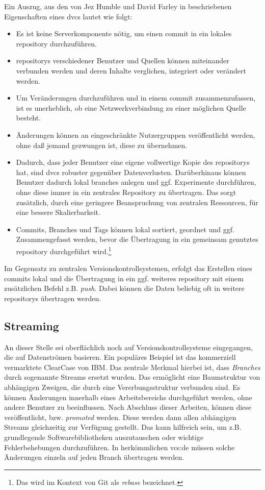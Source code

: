 Ein Auszug, aus den von Jez Humble und David Farley in \cite[S.~393-394]{cd}
beschriebenen Eigenschaften eines \acrshort{dvcs} lautet wie folgt:

\begin{itemize}
\item Es ist keine Serverkomponente nötig, um einen \gls{commit} in ein lokales
\gls{repository} durchzuführen.
\item \glspl{repository} verschiedener Benutzer und Quellen können miteinander
verbunden werden und deren Inhalte verglichen, integriert oder verändert werden.
\item Um Veränderungen durchzuführen und in einem \gls{commit} zusammenzufassen,
ist es unerheblich, ob eine Netzwerkverbindung zu einer möglichen Quelle besteht.
\item Änderungen können an eingeschränkte Nutzergruppen veröffentlicht werden,
ohne daß jemand gezwungen ist, diese zu übernehmen.
\item Dadurch, dass jeder Benutzer eine eigene vollwertige Kopie des
\glspl{repository} hat, sind \acrshort{dvcs} robuster gegenüber Datenverlusten.
Darüberhinaus können Benutzer dadurch lokal branches anlegen und ggf.
Experimente durchführen, ohne diese immer in ein zentrales Repository zu
übertragen.  Das sorgt zusätzlich, durch eine geringere Beanspruchung von
zentralen Ressourcen, für eine bessere Skalierbarkeit.
\item Commits, Branches und Tags können lokal sortiert, geordnet und ggf.
Zusammengefasst werden, bevor die Übertragung in ein gemeinsam genutztes
\gls{repository} durchgeführt wird.\footnote{Das wird im Kontext von Git als
\textit{rebase} bezeichnet.}
\end{itemize}

Im Gegensatz zu zentralen Versionskontrollsystemen, erfolgt das Erstellen eines
\glspl{commit} lokal und die Übertragung in ein ggf. weiteres \gls{repository}
mit einem zusätzlichen Befehl z.B. \textit{push}. Dabei können die Daten beliebig
oft in weitere \glspl{repository} übertragen werden.

\subsection{Streaming}\label{sec:streaming}
An dieser Stelle sei oberflächlich noch auf Versionskontrollsysteme
eingegangen, die auf Datenströmen basieren. Ein populäres Beispiel ist das
kommerziell vermarktete ClearCase von IBM. Das zentrale Merkmal hierbei ist,
dass \textit{Branches} durch sogenannte Streams ersetzt wurden. Das ermöglicht
eine Baumstruktur von abhängigen Zweigen, die durch eine Vererbungsstruktur
verbunden sind. Es können Änderungen innerhalb eines Arbeitsbereichs
durchgeführt werden, ohne andere Benutzer zu beeinflussen. Nach Abschluss
dieser Arbeiten, können diese veröffentlicht, bzw. \textit{promoted} werden.
Diese werden dann allen abhängigen Streams gleichzeitig zur Verfügung gestellt.
Das kann hilfreich sein, um z.B.  grundlegende Softwarebibliotheken
auszutauschen oder wichtige Fehlerbehebungen durchzuführen. In herkömmlichen
\acrshort{vcs:de} müssen solche Änderungen einzeln auf jeden Branch übertragen
werden.
